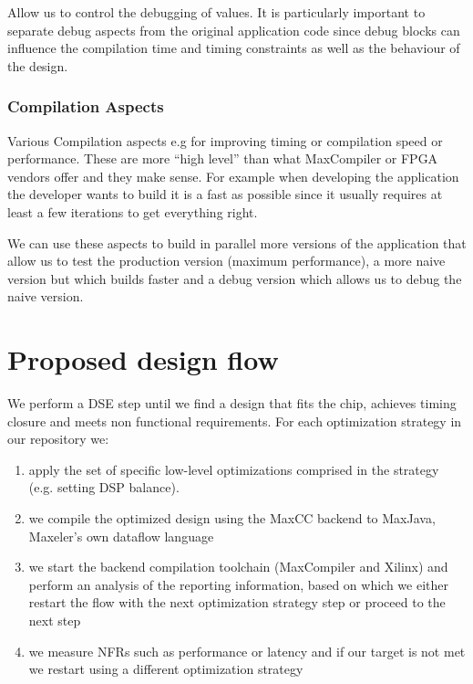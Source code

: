 Allow us to  control the debugging of values. It is particularly
important to separate debug aspects from the original application code
since debug blocks can influence the compilation time and timing
constraints as well as the behaviour of the design.


\subsubsection{Compilation Aspects}

Various Compilation aspects e.g for improving timing or
compilation speed or performance. These are more “high level”
than what MaxCompiler or FPGA vendors offer and they make
sense.  For example when developing the application the
developer wants to build it is a fast as possible since it
usually requires at least a few iterations to get everything
right.

We can use these aspects to build in parallel more versions of the
application that allow us to test the production version (maximum
performance), a more naive version but which builds faster and a debug
version which allows us to debug the naive version.



\section{Proposed design flow}

We perform a DSE step until we find a design that fits the chip,
achieves timing closure and meets non functional requirements.  For
each optimization strategy in our repository we:

\begin{enumerate}

\item apply the set of specific low-level optimizations comprised in
  the strategy (e.g. setting DSP balance).

\item  we compile the optimized
  design using the MaxCC backend to MaxJava, Maxeler's own dataflow
  language

\item we start the backend compilation toolchain (MaxCompiler
  and Xilinx) and perform an analysis of the reporting information,
  based on which we either restart the flow with the next optimization
  strategy step or proceed to the next step

\item we measure NFRs such as performance or latency and if our target
  is not met we restart using a different optimization strategy

\end{enumerate}

